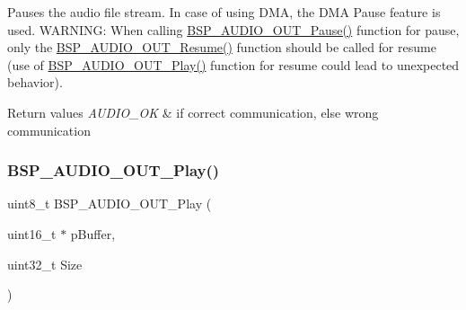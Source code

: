 Pauses the audio file stream. In case of using D\+MA, the D\+MA Pause feature is used. W\+A\+R\+N\+I\+NG\+: When calling \mbox{\hyperlink{group___s_t_m32_f4___d_i_s_c_o_v_e_r_y___a_u_d_i_o___o_u_t___private___functions_ga73a0f92b8adbfb2e8207067434c2bfef}{B\+S\+P\+\_\+\+A\+U\+D\+I\+O\+\_\+\+O\+U\+T\+\_\+\+Pause()}} function for pause, only the \mbox{\hyperlink{group___s_t_m32_f4___d_i_s_c_o_v_e_r_y___a_u_d_i_o___o_u_t___private___functions_ga064f0eddd4ab25a33fd1fe83af429c9f}{B\+S\+P\+\_\+\+A\+U\+D\+I\+O\+\_\+\+O\+U\+T\+\_\+\+Resume()}} function should be called for resume (use of \mbox{\hyperlink{group___s_t_m32_f4___d_i_s_c_o_v_e_r_y___a_u_d_i_o___o_u_t___private___functions_gaa415fdd481a01468fdfcd9d91f0f6711}{B\+S\+P\+\_\+\+A\+U\+D\+I\+O\+\_\+\+O\+U\+T\+\_\+\+Play()}} function for resume could lead to unexpected behavior). 


\begin{DoxyRetVals}{Return values}
{\em A\+U\+D\+I\+O\+\_\+\+OK} & if correct communication, else wrong communication \\
\hline
\end{DoxyRetVals}
\mbox{\label{group___s_t_m32_f4___d_i_s_c_o_v_e_r_y___a_u_d_i_o___o_u_t___exported___functions_gaa415fdd481a01468fdfcd9d91f0f6711}} 
\subsubsection{\texorpdfstring{B\+S\+P\+\_\+\+A\+U\+D\+I\+O\+\_\+\+O\+U\+T\+\_\+\+Play()}{BSP\_AUDIO\_OUT\_Play()}}
{\footnotesize\ttfamily uint8\+\_\+t B\+S\+P\+\_\+\+A\+U\+D\+I\+O\+\_\+\+O\+U\+T\+\_\+\+Play (\begin{DoxyParamCaption}\item[{uint16\+\_\+t $\ast$}]{p\+Buffer,  }\item[{uint32\+\_\+t}]{Size }\end{DoxyParamCaption})}



